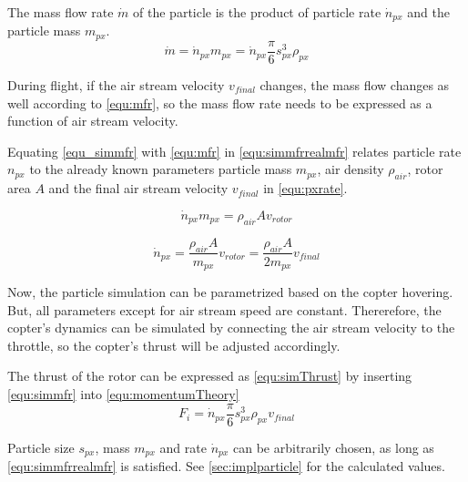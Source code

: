    The mass flow rate $\dot m$ of the particle is the product of particle rate $\dot n_{px}$ and the particle mass $m_{px}$.
    \begin{equation}
    \dot m =  \dot n_{px} m_{px}= \dot n_{px}  \frac{\pi}{6}s_{px}^3  \rho_{px}
    \label{equ_simmfr}
    \end{equation}
    
    During flight, if the air stream velocity $v_{final}$ changes, the mass flow changes as well according to \ref{equ:mfr}, so the mass flow rate needs to be expressed as a function of air stream velocity. 
    
    Equating \ref{equ_simmfr} with  \ref{equ:mfr} in \ref{equ:simmfrrealmfr} relates particle rate $n_{px}$ to the already known parameters particle mass $m_{px}$, air density $\rho_{air}$, rotor area $A$ and the final air stream velocity $v_{final}$ in \ref{equ:pxrate}.
    
    \begin{equation}
    \dot n_{px} m_{px} =  \rho_{air} A v_{rotor}
    \label{equ:simmfrrealmfr}
    \end{equation}
    
    \begin{equation}
    \dot n_{px} = \frac{\rho_{air} A}{m_{px}} v_{rotor} = \frac{\rho_{air} A}{2m_{px}} v_{final}
    \label{equ:pxrate}
    \end{equation}
    
    Now, the particle simulation can be parametrized based on the copter hovering. 
    But, all parameters except for air stream speed are constant.
    Thererefore,  the copter's dynamics can be simulated by connecting the air stream velocity to the throttle, so the copter's thrust will be adjusted accordingly.
    
    The thrust of the rotor can be expressed as \ref{equ:simThrust} by inserting \ref{equ:simmfr} into \ref{equ:momentumTheory}
    \begin{equation}
    F_i = \dot n_{px}  \frac{\pi}{6}s_{px}^3  \rho_{px} v_{final}
    \end{equation}
    
    Particle size $s_{px}$, mass $m_{px}$ and rate $\dot n_{px}$ can be arbitrarily chosen, as long as \ref{equ:simmfrrealmfr} is satisfied. See \ref{sec:implparticle} for the calculated values.
    
    

    

    
